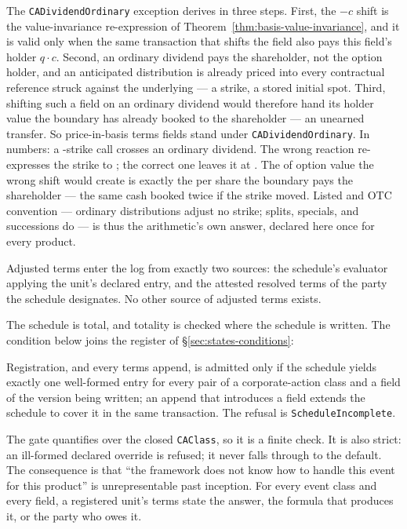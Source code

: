 The \texttt{CADividendOrdinary} exception derives in three steps. First, the
$-c$ shift is the value-invariance re-expression of
Theorem~\ref{thm:basis-value-invariance}, and it is valid only when the same
transaction that shifts the field also pays this field's holder $q\cdot c$.
Second, an ordinary dividend pays the shareholder, not the option holder, and
an anticipated distribution is already priced into every contractual
reference struck against the underlying --- a strike, a stored initial spot.
Third, shifting such a field on an ordinary dividend would therefore hand its
holder value the boundary has already booked to the shareholder --- an
unearned transfer. So price-in-basis terms fields stand under
\texttt{CADividendOrdinary}. In numbers: a -strike call crosses an
ordinary  dividend. The wrong reaction re-expresses the strike to
; the correct one leaves it at . The  of option value
the wrong shift would create is exactly the  per share the boundary
pays the shareholder --- the same cash booked twice if the strike moved.
Listed and OTC convention --- ordinary distributions adjust no strike;
splits, specials, and successions do --- is thus the arithmetic's own answer,
declared here once for every product.

\begin{principle}
\label{prin:schedule-authority}
Adjusted terms enter the log from exactly two sources: the schedule's evaluator
applying the unit's declared entry, and the attested resolved terms of the party the
schedule designates. No other source of adjusted terms exists.
\end{principle}

The schedule is total, and totality is checked where the schedule is written. The
condition below joins the register of \S\ref{sec:states-conditions}:

\begin{description}[style=nextline]
\item[C14 (adjustment-schedule totality).]\hypertarget{cond:C14}{}\label{cond:C14}
Registration, and every terms append, is admitted only if the schedule yields
exactly one well-formed entry for every pair of a corporate-action class and a field
of the version being written; an append that introduces a field extends the schedule
to cover it in the same transaction. The refusal is \texttt{ScheduleIncomplete}.
\end{description}

\noindent
The gate quantifies over the closed \texttt{CAClass}, so it is a finite check.
It is also strict: an ill-formed declared override is refused; it never falls
through to the default. The consequence is that ``the framework does not know how to handle this
event for this product'' is unrepresentable past inception. For every event class
and every field, a registered unit's terms state the answer, the formula that
produces it, or the party who owes it.

